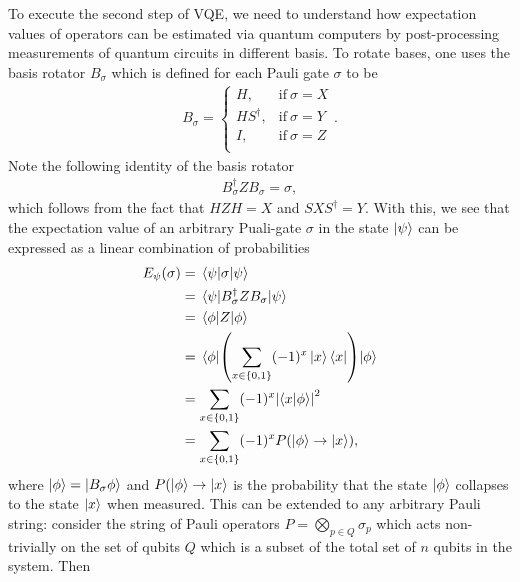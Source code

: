 \documentclass[Dual]{msu-thesis}
\begin{document}
To execute the second step of VQE, we need to understand how expectation values of operators can be estimated via quantum computers by post-processing measurements of quantum circuits in different basis. To rotate bases, one uses the basis rotator $B_\sigma$ which is defined for each Pauli gate $\sigma$ to be
\begin{align}
B_{\sigma} =
\begin{cases}
H, & \text{if} \ \sigma = X \\
HS^{\dagger}, & \text{if} \ \sigma = Y \\
I, & \text{if} \ \sigma = Z \\
\end{cases}
.\end{align}
Note the following identity of the basis rotator
\begin{align}
B^\dagger_\sigma Z B_\sigma = \sigma
,\end{align}
which follows from the fact that $HZH=X$ and $SXS^\dagger=Y$. With this, we see that the expectation value of an arbitrary Puali-gate $\sigma$ in the state $\ket{\psi}$ can be expressed as a linear combination of probabilities
\begin{align}
E_{\psi}(\sigma)
&= \mel{\psi}{\sigma}{\psi} \nonumber \\
&=\mel{\psi}{B_{\sigma}^{\dagger}ZB_{\sigma}}{\psi} \nonumber \\
&=\mel{\phi}{Z}{\phi} \nonumber \\
&=\mel{\phi}{\left(\sum_{x\in\{0,1\}}(-1)^x\ket{x}\bra{x}\right)}{\phi} \nonumber \\
&=\sum_{x\in\{0,1\}}(-1)^x\abs{\bra{x}\ket{\phi}}^2\nonumber \\
&=\sum_{x\in\{0,1\}}(-1)^xP(\ket{\phi}\to\ket{x})
,\end{align}
where $\ket{\phi}=\ket{B_\sigma\phi}$ and $P(\ket{\phi}\to\ket{x}$ is the probability that the state $\ket{\phi}$ collapses to the state $\ket{x}$ when measured. This can be extended to any arbitrary Pauli string: consider the string of Pauli operators $P=\bigotimes_{p\in Q}\sigma_p$ which acts non-trivially on the set of qubits $Q$ which is a subset of the total set of $n$ qubits in the system. Then 
\end{document}
